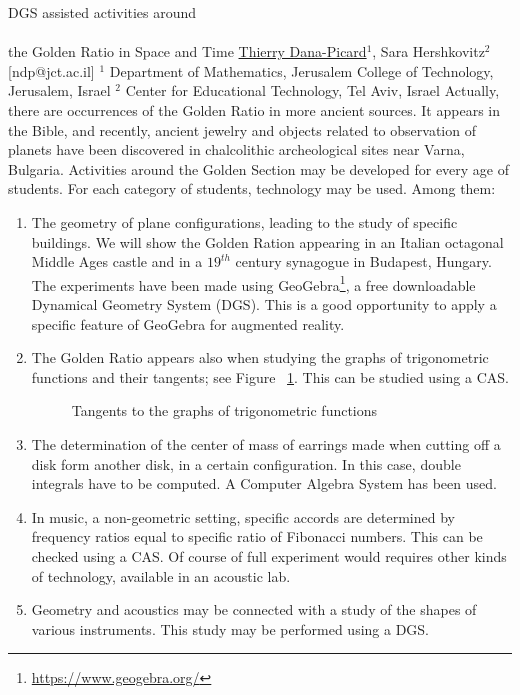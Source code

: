 \begin{abstract_online}{DGS assisted activities around \\ \quad \\ the Golden Ratio in Space and Time}{%
        \underline{Thierry Dana-Picard}$^{1}$, Sara Hershkovitz$^{2}$}{[ndp@jct.ac.il]
        }{%
        $^1$ Department of Mathematics, Jerusalem College of Technology, Jerusalem, Israel \newline{}$^2$ Center for Educational Technology, Tel Aviv, Israel \newline{}}
Actually, there are occurrences of the Golden Ratio in more ancient sources. It appears in the Bible, and recently, ancient jewelry and objects related to observation of planets have been discovered in chalcolithic archeological sites near Varna, Bulgaria.
Activities around the Golden Section may be developed for every age of students. For each category of students, technology may be used. Among them:
\begin{enumerate}
\item The geometry of plane configurations, leading to the study of specific buildings. We will show the Golden Ration appearing in an Italian octagonal Middle Ages castle and in a $19^{th}$ century synagogue in Budapest, Hungary. The experiments have been made using GeoGebra\footnote{\url{https://www.geogebra.org/}}, a free downloadable Dynamical Geometry System (DGS). This is a good opportunity to apply a specific feature of GeoGebra for augmented reality.
\item The Golden Ratio appears also when studying the graphs of trigonometric functions and their tangents; see Figure ~\ref{fig trig}. This can be studied using a CAS.
 \begin{figure}[h]
\centering
\mbox{}
\caption{Tangents to the graphs of trigonometric functions}
\label{fig trig}
\end{figure}
\item The determination of the center of mass of earrings made when cutting off a disk form another disk, in a certain configuration. In this case, double integrals have to be computed. A Computer Algebra System has been used.
\item In music, a non-geometric setting, specific accords are determined by frequency ratios equal to specific ratio of Fibonacci numbers. This can be checked using a CAS. Of course of full experiment would requires other kinds of technology, available in an acoustic lab.
\item Geometry and acoustics may be connected with a study of the shapes of various instruments. This study may be performed using a DGS.

\end{enumerate}
\end{abstract_online}
